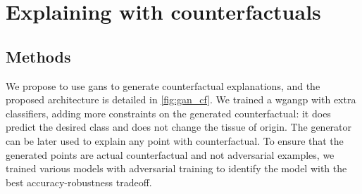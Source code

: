 \documentclass[../main.tex]{subfiles}
\begin{document}
\chapter{Explaining with counterfactuals}\label{chap:counterfactuals}
\minitocpage
\section{Methods}
	We propose to use \glspl{gan} to generate counterfactual explanations, and the proposed architecture is detailed in \cref{fig:gan_cf}.
	We trained a \gls{wgangp} with extra classifiers, adding more constraints on the generated counterfactual: it does predict the desired class and does not change the tissue of origin.
	The generator can be later used to explain any point with counterfactual.
	To ensure that the generated points are actual counterfactual and not adversarial examples, we trained various models with adversarial training to identify the model with the best accuracy-robustness tradeoff.
\end{document}
